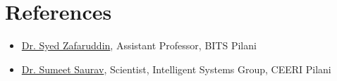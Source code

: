 \section{References}
 
\begin{itemize}
    
    \item{\href{https://www.bits-pilani.ac.in/pilani/syedzafaruddin/Profile}{Dr. Syed Zafaruddin}, Assistant Professor, BITS Pilani}
    
    \item{\href{https://www.ceeri.res.in/profiles/sumeet-saurav/}{Dr. Sumeet Saurav}, Scientist, Intelligent Systems Group, CEERI Pilani}
    
\end{itemize}